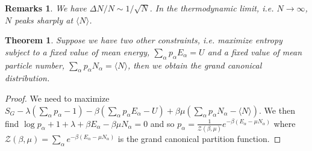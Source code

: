 \documentclass[a4paper]{article}
\newtheorem{remarks}{Remarks}[section]
\theoremstyle{new}
\newtheorem{thm}{Theorem}[section]
\begin{document}
\begin{remarks}
We have $\Delta N/N\sim1/\sqrt{N}$. In the thermodynamic limit, i.e. $N\rightarrow\infty$, $N$ peaks sharply at $\langle N\rangle$.
\end{remarks}
\begin{thm}
Suppose we have two other constraints, i.e. maximize entropy subject to a fixed value of mean energy, $\sum_\alpha p_\alpha E_\alpha=U$ and a fixed value of mean particle number, $\sum_\alpha p_\alpha N_\alpha=\langle N\rangle$, then we obtain the grand canonical distribution.
\end{thm}
\begin{proof}
We need to maximize $S_G-\lambda(\sum_\alpha p_\alpha-1)-\beta(\sum_\alpha p_\alpha E_\alpha-U)+\beta\mu(\sum_\alpha p_\alpha N_\alpha-\langle N\rangle)$. We then find $\log p_\alpha+1+\lambda+\beta E_\alpha-\beta\mu N_\alpha=0$ and so $p_\alpha=\frac{1}{\mathcal{Z}(\beta,\mu)}e^{-\beta(E_\alpha-\mu N_\alpha)}$ where $\mathcal{Z}(\beta,\mu)=\sum_\alpha e^{-\beta(E_\alpha-\mu N_\alpha)}$ is the grand canonical partition function.
\end{proof}
\end{document}
